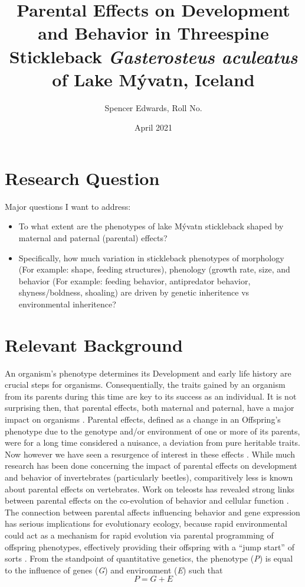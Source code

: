 \documentclass[12pt]{extarticle}
\title{Parental Effects on Development and Behavior in Threespine Stickleback \textit{Gasterosteus aculeatus} of Lake M\'yvatn, Iceland}
\author{Spencer Edwards, Roll No.}
\date{April 2021}
\begin{document}
\maketitle

\section*{Research Question}
Major questions I want to address:
\begin{itemize}
 \item To what extent are the phenotypes of lake M\'yvatn stickleback 
shaped by maternal and paternal (parental) effects?
 \item Specifically, how much variation in stickleback phenotypes of morphology (For example:  shape, feeding structures), phenology (growth rate, size,  and behavior (For example: feeding behavior, antipredator behavior, shyness/boldness, shoaling) are driven by genetic inheritence vs environmental inheritence?
\end{itemize}

\section*{Relevant Background}
An organism’s phenotype determines its  
Development and early life history are crucial steps for organisms. Consequentially, the traits gained by an organism from its parents during this time are key to its success as an individual.  It is not surprising then, that parental effects, both maternal and paternal, have a major impact on organisms \citep{charmantier_garant_kruuk_2014, Danchin2011, Badyaev2009}. Parental effects, defined as a change in an Offspring's phenotype due to the genotype and/or environment of one or more of its parents, were for a long time considered a nuisance, a deviation from pure heritable traits. Now however we have seen a resurgence of interest in these effects \citep{charmantier_garant_kruuk_2014}. While much research has been done concerning the impact of parental effects on development \citep{Tigreros2021} and behavior of invertebrates (particularly beetles), comparitively less is known about parental effects on vertebrates. Work on teleosts has revealed strong links between parental effects on the co-evolution of behavior and cellular function \citep{Yoshizawa2012}. The connection between parental affects influencing behavior and gene expression has serious implications for evolutionary ecology, because rapid environmental could act as a mechanism for rapid evolution via parental programming of offspring phenotypes, effectively providing their offspring with a ``jump start'' of sorts \citep{Danchin2011, Donelson2018}. 
From the standpoint of quantitative genetics, the phenotype (\textit{P}) is equal to the influence of genes (\textit{G}) and environment (\textit{E}) such that $$P = G + E $$
\end{document}
